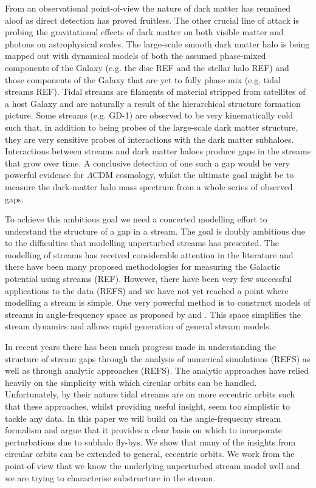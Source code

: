 \documentclass[useAMS,usenatbib,fleqn,a4paper]{mn2e}
\begin{document}
From an observational point-of-view the nature of dark matter has remained aloof as direct detection has proved fruitless. The other crucial line of attack is probing the gravitational effects of dark matter on both visible matter and photons on astrophysical scales. The large-scale smooth dark matter halo is being mapped out with dynamical models of both the assumed phase-mixed components of the Galaxy (e.g. the disc REF and the stellar halo REF) and those components of the Galaxy that are yet to fully phase mix (e.g. tidal streams REF). Tidal streams are filaments of material stripped from satellites of a host Galaxy and are naturally a result of the hierarchical structure formation picture. Some streams (e.g. GD-1) are observed to be very kinematically cold such that, in addition to being probes of the large-scale dark matter structure, they are very sensitive probes of interactions with the dark matter subhaloes. Interactions between streams and dark matter haloes produce gaps in the streams that grow over time. A conclusive detection of one such a gap would be very powerful evidence for $\Lambda$CDM cosmology, whilst the ultimate goal might be to measure the dark-matter halo mass spectrum from a whole series of observed gaps.

To achieve this ambitious goal we need a concerted modelling effort to understand the structure of a gap in a stream. The goal is doubly ambitious due to the difficulties that modelling unperturbed streams has presented. The modelling of streams has received considerable attention in the literature and there have been many proposed methodologies for measuring the Galactic potential using streams (REF). However, there have been very few successful applications to the data (REFS) and we have not yet reached a point where modelling a stream is simple. One very powerful method is to construct models of streams in angle-frequency space as proposed by \cite{Bovy2014} and \cite{Sanders2014}. This space simplifies the stream dynamics \citep{HelmiWhite1999,Tremaine1999} and allows rapid generation of general stream models.

In recent years there has been much progress made in understanding the structure of stream gaps through the analysis of numerical simulations (REFS) as well as through analytic approaches (REFS). The analytic approaches have relied heavily on the simplicity with which circular orbits can be handled. Unfortunately, by their nature tidal streams are on more eccentric orbits such that these approaches, whilst providing useful insight, seem too simplistic to tackle any data. In this paper we will build on the angle-frequecny stream formalism and argue that it provides a clear basis on which to incorporate perturbations due to subhalo fly-bys. We show that many of the insights from circular orbits can be extended to general, eccentric orbits. We work from the point-of-view that we know the underlying unperturbed stream model well and we are trying to characterise substructure in the stream.
\end{document}
